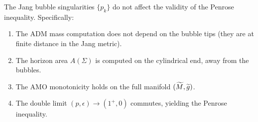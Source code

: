 \begin{corollary}\label{cor:BubbleInvisible}
The Jang bubble singularities $\{p_k\}$ do not affect the validity of the Penrose inequality. Specifically:
\begin{enumerate}
    \item The ADM mass computation does not depend on the bubble tips (they are at finite distance in the Jang metric).
    \item The horizon area $A(\Sigma)$ is computed on the cylindrical end, away from the bubbles.
    \item The AMO monotonicity holds on the full manifold $(\widetilde{M}, \widetilde{g})$.
    \item The double limit $(p, \epsilon) \to (1^+, 0)$ commutes, yielding the Penrose inequality.
\end{enumerate}
\end{corollary}

